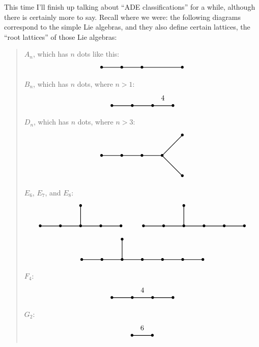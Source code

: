 \documentclass{article}
\begin{document}
This time I'll finish up talking about ``ADE classifications'' for a
while, although there is certainly more to say. Recall where we were:
the following diagrams correspond to the simple Lie algebras, and they
also define certain lattices, the ``root lattices'' of those Lie
algebras:

\begin{quote}
\(A_n\), which has \(n\) dots like this: \[
  \begin{tikzpicture}
    \draw[thick] (0,0) node{$\bullet$} to (1,0) node{$\bullet$} to (2,0) node {$\bullet$} to (4,0) node{$\bullet$};
  \end{tikzpicture}
\] \(B_n\), which has \(n\) dots, where \(n > 1\): \[
  \begin{tikzpicture}
    \draw[thick] (0,0) node{$\bullet$} to (1,0) node{$\bullet$} to (2,0) node{$\bullet$} to node[label=above:{4}]{} (3,0) node {$\bullet$};
  \end{tikzpicture}
\] \(D_n\), which has \(n\) dots, where \(n > 3\): \[
  \begin{tikzpicture}
    \draw[thick] (0,0) node{$\bullet$} to (1,0) node{$\bullet$} to (2,0) node{$\bullet$} to (3,0) node {$\bullet$};
    \draw[thick] (3,0) to (4,1) node {$\bullet$};
    \draw[thick] (3,0) to (4,-1) node {$\bullet$};
  \end{tikzpicture}
\] \(E_6\), \(E_7\), and \(E_8\): \[
  \begin{gathered}
    \begin{tikzpicture}
      \draw[thick] (0,0) node{$\bullet$} to (1,0) node{$\bullet$} to (2,0) node{$\bullet$} to (3,0) node {$\bullet$} to (4,0) node {$\bullet$};
      \draw[thick] (2,0) to (2,1) node{$\bullet$};
    \end{tikzpicture}
    \qquad
    \begin{tikzpicture}
      \draw[thick] (0,0) node{$\bullet$} to (1,0) node{$\bullet$} to (2,0) node{$\bullet$} to (3,0) node {$\bullet$} to (4,0) node {$\bullet$} to (5,0) node {$\bullet$};
      \draw[thick] (2,0) to (2,1) node{$\bullet$};
    \end{tikzpicture}
  \\\begin{tikzpicture}
      \draw[thick] (0,0) node{$\bullet$} to (1,0) node{$\bullet$} to (2,0) node{$\bullet$} to (3,0) node {$\bullet$} to (4,0) node {$\bullet$} to (5,0) node {$\bullet$} to (6,0) node {$\bullet$};
      \draw[thick] (2,0) to (2,1) node{$\bullet$};
    \end{tikzpicture}
  \end{gathered}
\] \(F_4\): \[
  \begin{tikzpicture}
    \draw[thick] (0,0) node{$\bullet$} to (1,0) node{$\bullet$} to node[label=above:{4}]{} (2,0) node{$\bullet$} to (3,0) node {$\bullet$};
  \end{tikzpicture}
\] \(G_2\): \[
  \begin{tikzpicture}
    \draw[thick] (0,0) node{$\bullet$} to node[label=above:{6}]{} (1,0) node{$\bullet$};
  \end{tikzpicture}
\]
\end{quote}
\end{document}
